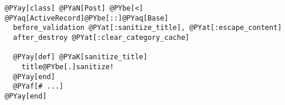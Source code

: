 \begin{Verbatim}[commandchars=@\[\]]
@PYay[class] @PYaN[Post] @PYbe[<] @PYaq[ActiveRecord]@PYbe[::]@PYaq[Base]
  before_validation @PYat[:sanitize_title], @PYat[:escape_content]
  after_destroy @PYat[:clear_category_cache]

  @PYay[def] @PYaK[sanitize_title]
    title@PYbe[.]sanitize!
  @PYay[end]
  @PYaf[# ...]
@PYay[end]
\end{Verbatim}
